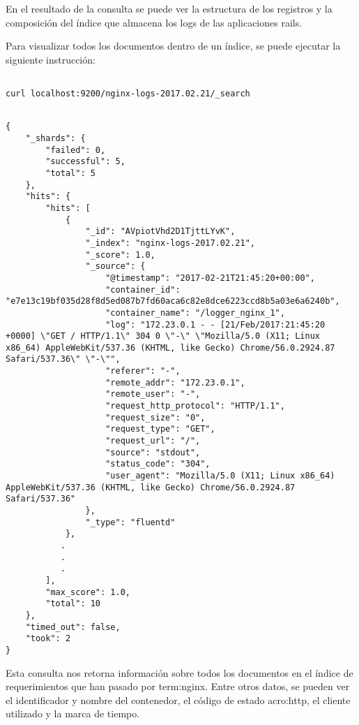 En el resultado de la consulta se puede ver la estructura de los registros y la
composición del índice que almacena los logs de las aplicaciones rails.

Para visualizar todos los documentos dentro de un índice, se puede ejecutar la
siguiente instrucción:

\begin{lstlisting}

curl localhost:9200/nginx-logs-2017.02.21/_search

\end{lstlisting}

\begin{lstlisting}

{
    "_shards": {
        "failed": 0,
        "successful": 5,
        "total": 5
    },
    "hits": {
        "hits": [
            {
                "_id": "AVpiotVhd2D1TjttLYvK",
                "_index": "nginx-logs-2017.02.21",
                "_score": 1.0,
                "_source": {
                    "@timestamp": "2017-02-21T21:45:20+00:00",
                    "container_id": "e7e13c19bf035d28f8d5ed087b7fd60aca6c82e8dce6223ccd8b5a03e6a6240b",
                    "container_name": "/logger_nginx_1",
                    "log": "172.23.0.1 - - [21/Feb/2017:21:45:20 +0000] \"GET / HTTP/1.1\" 304 0 \"-\" \"Mozilla/5.0 (X11; Linux x86_64) AppleWebKit/537.36 (KHTML, like Gecko) Chrome/56.0.2924.87 Safari/537.36\" \"-\"",
                    "referer": "-",
                    "remote_addr": "172.23.0.1",
                    "remote_user": "-",
                    "request_http_protocol": "HTTP/1.1",
                    "request_size": "0",
                    "request_type": "GET",
                    "request_url": "/",
                    "source": "stdout",
                    "status_code": "304",
                    "user_agent": "Mozilla/5.0 (X11; Linux x86_64) AppleWebKit/537.36 (KHTML, like Gecko) Chrome/56.0.2924.87 Safari/537.36"
                },
                "_type": "fluentd"
            },
           .
           .
           .
        ],
        "max_score": 1.0,
        "total": 10
    },
    "timed_out": false,
    "took": 2
}

\end{lstlisting}

Esta consulta nos retorna información sobre todos los documentos en el índice
de requerimientos  que han pasado por \gls{term:nginx}. Entre
otros datos, se pueden ver el identificador y nombre del contenedor, el código
de estado \gls{acro:http}, el cliente  utilizado y la marca de
tiempo.

